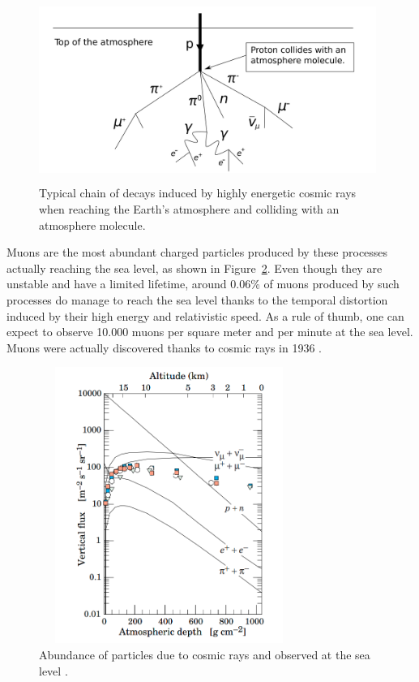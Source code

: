 \documentclass[a4paper, 11pt]{report}
\begin{document}
\begin{figure}[htbp]
\begin{center}
\includegraphics[width=11cm, height=6cm]{figs/cosmic.png}
\caption{Typical chain of decays induced by highly energetic cosmic rays when reaching the Earth's atmosphere and colliding with an atmosphere molecule.}
\label{figure:cosmic}
\end{center}
\end{figure}

Muons are the most abundant charged particles produced by these processes actually reaching the sea level, as shown in Figure~\ref{figure:cosmicAbundance}. Even though they are unstable and have a limited lifetime, around 0.06\% of muons produced by such processes do manage to reach the sea level thanks to the temporal distortion induced by their high energy and relativistic speed. As a rule of thumb, one can expect to observe 10.000 muons per square meter and per minute at the sea level. Muons were actually discovered thanks to cosmic rays in 1936 \cite{muonDiscovery}.

\begin{figure}[htbp]
\begin{center}
\includegraphics[width=8.5cm, height=9cm]{figs/cosmicMuons.png}
\caption{Abundance of particles due to cosmic rays and observed at the sea level \cite{cosmicPDG}.}
\label{figure:cosmicAbundance}
\end{center}
\end{figure}
\end{document}
